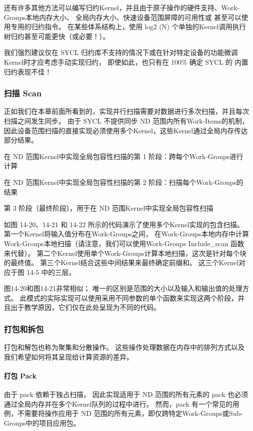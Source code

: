 还有许多其他方法可以编写归约Kernel，并且由于原子操作的硬件支持、Work-Groups本地内存大小、
全局内存大小、快速设备范围屏障的可用性或 甚至可以使用专用的归约指令。 
在某些体系结构上，使用 log2 (N) 个单独的Kernel调用执行树归约甚至可能更快（或必要！）。

我们强烈建议仅在 SYCL 归约库不支持的情况下或在针对特定设备的功能微调Kernel时才应考虑手动实现归约，
即使如此，也只有在 100\% 确定 SYCL 的 内置归约表现不佳！

\subsubsection{扫描 Scan}
正如我们在本章前面所看到的，实现并行扫描需要对数据进行多次扫描，并且每次扫描之间发生同步。 
由于 SYCL 不提供同步 ND 范围内所有Work-Items的机制，
因此设备范围扫描的直接实现必须使用多个Kernel，这些Kernel通过全局内存传达部分结果。

{\color{red} 在 ND 范围Kernel中实现全局包容性扫描的第 1 阶段：跨每个Work-Groups进行计算}

{\color{red} 在 ND 范围Kernel中实现全局包容性扫描的第 2 阶段：扫描每个Work-Groups的结果}

{\color{red} 第 3 阶段（最终阶段），用于在 ND 范围Kernel中实现全局包容性扫描}

如图 14-20、14-21 和 14-22 所示的代码演示了使用多个Kernel实现的包含扫描。 
第一个Kernel将输入值分布在Work-Groups之间，
在Work-Groups本地内存中计算Work-Groups本地扫描（请注意，我们可以使用Work-Groups Include\_scan 函数来代替）。 
第二个Kernel使用单个Work-Groups计算本地扫描，这次是针对每个块的最终值。 
第三个Kernel结合这些中间结果来最终确定前缀和。 这三个Kernel对应于图 14-5 中的三层。

图14-20和图14-21非常相似； 唯一的区别是范围的大小以及输入和输出值的处理方式。 
此模式的实际实现可以使用采用不同参数的单个函数来实现这两个阶段，并且出于教学原因，它们仅在此处呈现为不同的代码。

\subsubsection{打包和拆包}
打包和解包也称为聚集和分散操作。 这些操作处理数据在内存中的排列方式以及我们希望如何将其呈现给计算资源的差异。

\paragraph{打包 Pack}

由于 pack 依赖于独占扫描，
因此实现适用于 ND 范围的所有元素的 pack 也必须通过全局内存并在多个Kernel队列的过程中进行。 
然而，pack 有一个常见的用例，不需要将操作应用于 ND 范围的所有元素，即仅跨特定Work-Groups或Sub-Groups中的项目应用包。

